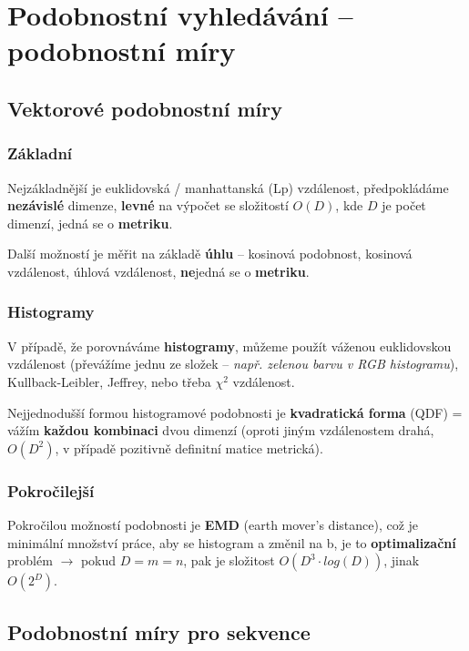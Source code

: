 \section{Podobnostní vyhledávání -- podobnostní míry}

\subsection{Vektorové podobnostní míry}

\subsubsection{Základní}

Nejzákladnější je euklidovská / manhattanská (Lp) vzdálenost, předpokládáme \textbf{nezávislé} dimenze, \textbf{levné} na výpočet se složitostí $O(D)$, kde $D$ je počet dimenzí, jedná se o \textbf{metriku}.

Další možností je měřit na základě \textbf{úhlu} -- kosinová podobnost, kosinová vzdálenost, úhlová vzdálenost, \textbf{ne}jedná se o \textbf{metriku}.

\subsubsection{Histogramy}

V případě, že porovnáváme \textbf{histogramy}, můžeme použít váženou euklidovskou vzdálenost (převážíme jednu ze složek -- \textit{např. zelenou barvu v RGB histogramu}), Kullback-Leibler, Jeffrey, nebo třeba $\chi^2$ vzdálenost.

Nejjednodušší formou histogramové podobnosti je \textbf{kvadratická forma} (QDF) = vážím \textbf{každou kombinaci} dvou dimenzí (oproti jiným vzdálenostem drahá, $O(D^2)$, v případě pozitivně definitní matice metrická).

\subsubsection{Pokročilejší}

Pokročilou možností podobnosti je \textbf{EMD} (earth mover's distance), což je minimální množství práce, aby se histogram a změnil na b, je to \textbf{optimalizační} problém $\to$ pokud $D = m = n$, pak je složitost $O(D^3 \cdot log(D))$, jinak $O(2^D)$.

\subsection{Podobnostní míry pro sekvence}

